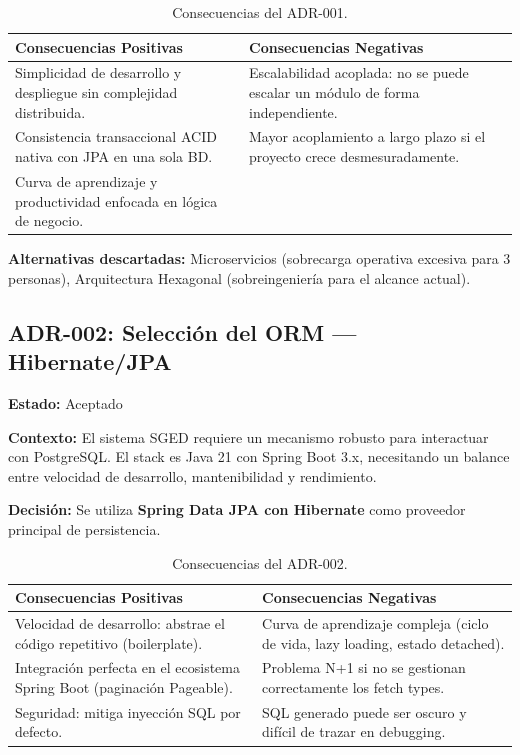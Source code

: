 \documentclass[12pt]{article}
\begin{document}
	\begin{table}[H]
		\centering
		\begin{tabular}{@{}p{7cm}p{7cm}@{}}
			\toprule
			\textbf{Consecuencias Positivas} & \textbf{Consecuencias Negativas} \\ \midrule
			Simplicidad de desarrollo y despliegue sin complejidad distribuida. & Escalabilidad acoplada: no se puede escalar un módulo de forma independiente. \\[4pt]
			Consistencia transaccional ACID nativa con JPA en una sola BD. & Mayor acoplamiento a largo plazo si el proyecto crece desmesuradamente. \\[4pt]
			Curva de aprendizaje y productividad enfocada en lógica de negocio. & \\
			\bottomrule
		\end{tabular}
		\caption{Consecuencias del ADR-001.}
	\end{table}
	
	\textbf{Alternativas descartadas:} Microservicios (sobrecarga operativa excesiva para 3 personas), Arquitectura Hexagonal (sobreingeniería para el alcance actual).
	
	\subsection{ADR-002: Selección del ORM — Hibernate/JPA}
	\textbf{Estado:} \textcolor{codegreen}{Aceptado}
	
	\textbf{Contexto:} El sistema SGED requiere un mecanismo robusto para interactuar con PostgreSQL. El stack es Java 21 con Spring Boot 3.x, necesitando un balance entre velocidad de desarrollo, mantenibilidad y rendimiento.
	
	\textbf{Decisión:} Se utiliza \textbf{Spring Data JPA con Hibernate} como proveedor principal de persistencia.
	
	\begin{table}[H]
		\centering
		\begin{tabular}{@{}p{7cm}p{7cm}@{}}
			\toprule
			\textbf{Consecuencias Positivas} & \textbf{Consecuencias Negativas} \\ \midrule
			Velocidad de desarrollo: abstrae el código repetitivo (boilerplate). & Curva de aprendizaje compleja (ciclo de vida, lazy loading, estado detached). \\[4pt]
			Integración perfecta en el ecosistema Spring Boot (paginación Pageable). & Problema N+1 si no se gestionan correctamente los fetch types. \\[4pt]
			Seguridad: mitiga inyección SQL por defecto. & SQL generado puede ser oscuro y difícil de trazar en debugging. \\
			\bottomrule
		\end{tabular}
		\caption{Consecuencias del ADR-002.}
	\end{table}
	
\end{document}
